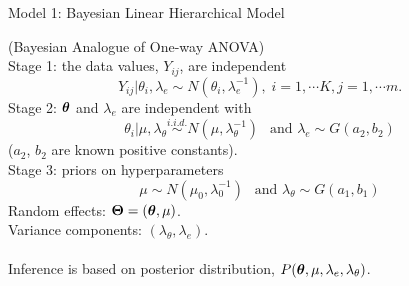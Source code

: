 \documentclass{report}
\newcommand{\bthet}{ \mbox{\boldmath $\theta$}}
\newcommand{\lambdaT}{\lambda_{\theta}}
\newcommand{\bOne}{ {\bf 1} }
\newcommand{\bTheta}{ \mbox{\boldmath $\Theta$}}
\newcommand{\head}[1]
{
  \begin{center}
      {\huge {\color{blue} #1}}
    \end{center}
  }
\begin{document}
\newpage \head{Model 1: Bayesian Linear Hierarchical Model}
(Bayesian Analogue of One-way ANOVA)\\
Stage 1: the data values, $Y_{ij}$, are independent
\begin{equation*}
Y_{ij}|\theta_i,\lambda_e \sim N(\theta_i, \lambda_e^{-1}), \; i=1,\cdots K, j=1,\cdots m.
\end{equation*}
Stage 2: $\bthet$ and $\lambda_e$ are independent with 
\begin{equation*}
  \theta_i|\mu, \lambdaT  \stackrel{i.i.d.}{\sim} N(\mu, \lambdaT^{-1})\:\:\mbox{ and } \lambda_e \sim G(a_2, b_2)
\end{equation*}
($a_2$, $b_2$ are known positive constants).\\
Stage 3: priors on hyperparameters
\begin{equation*}
  \mu \sim N(\mu_0, \lambda_0^{-1})\:\:\mbox{ and } \lambdaT \sim G(a_1, b_1)
\end{equation*}
Random effects: $\bTheta=(\bthet,\mu)$.\\
Variance components: $(\lambdaT,\lambda_e)$.\\\\
Inference is based on posterior distribution, $P(\bthet,\mu,\lambda_e,\lambdaT)$.\\
\end{document}
